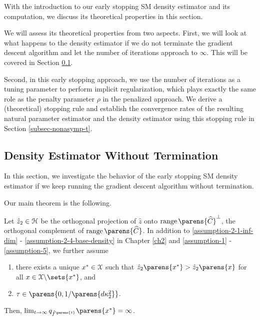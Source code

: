 With the introduction to our early stopping SM density estimator and its computation, we discuss its theoretical properties in this section. 

We will assess its theoretical properties from two aspects. First, we will look at what happens to the density estimator if we do not terminate the gradient descent algorithm and let the number of iterations approach to $\infty$. This will be covered in Section \ref{subsec-smes-limiting-t}. 

Second, in this early stopping approach, we use the number of iterations as a tuning parameter to perform implicit regularization, which plays exactly the same role as the penalty parameter $\rho$ in the penalized approach. We derive a (theoretical) stopping rule and establish the convergence rates of the resulting natural parameter estimator and the density estimator using this stopping rule in Section \ref{subsec-nonasymp-t}.

\subsection{Density Estimator Without Termination} \label{subsec-smes-limiting-t}

In this section, we investigate the behavior of the early stopping SM density estimator if we keep running the gradient descent algorithm without termination. 

Our main theorem is the following. 

\begin{theorem}\label{thm-limiting-density-t}
	Let $\hat{z}_2 \in \mathcal{H}$ be the orthogonal projection of $\hat{z}$ onto $\range \parens{\widehat{C}}^{\perp}$, the orthogonal complement of $\range \parens{\widehat{C}}$. In addition to \ref{assumption-2-1-inf-dim} - \ref{assumption-2-4-base-density} in Chapter \ref{ch2} and \ref{assumption-1} - \ref{assumption-5}, we further assume 
	\begin{enumerate}[label=\textbf{(C\arabic*)}]
		\item \label{assumption-limiting-1} there exists a unique $x^* \in \mathcal{X}$ such that 
		$\hat{z}_2 \parens{x^*} > \hat{z}_2 \parens{x}$ for all $x \in \calX \backslash \sets{x^*}$, and 
		\item \label{assumption-limiting-2} $\tau \in \parens{0, 1 / \parens{d \kappa_2^2}}$. 
	\end{enumerate}
	Then, $\lim_{t \to \infty} q_{\hat{f}^{\parens{t}}} \parens{x^*} = \infty$. 
\end{theorem}

